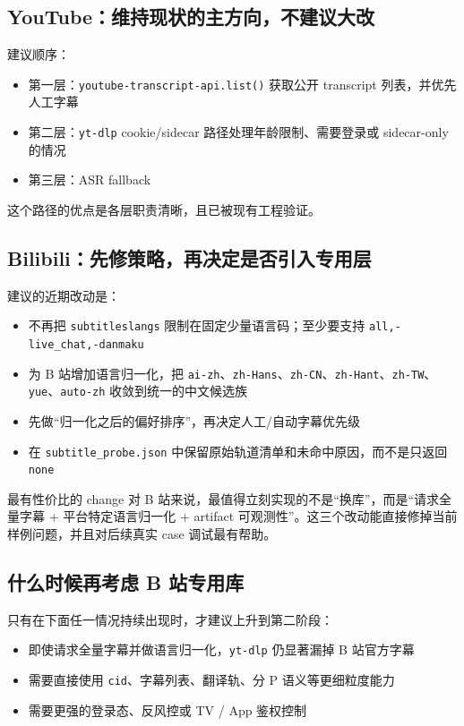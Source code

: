 \documentclass[a4paper]{article}
\begin{document}
\subsection{YouTube：维持现状的主方向，不建议大改}

建议顺序：
\begin{itemize}
\item 第一层：\texttt{youtube-transcript-api.list()} 获取公开 transcript 列表，并优先人工字幕
\item 第二层：\texttt{yt-dlp} cookie/sidecar 路径处理年龄限制、需要登录或 sidecar-only 的情况
\item 第三层：ASR fallback
\end{itemize}

这个路径的优点是各层职责清晰，且已被现有工程验证。

\subsection{Bilibili：先修策略，再决定是否引入专用层}

建议的近期改动是：
\begin{itemize}
\item 不再把 \texttt{subtitleslangs} 限制在固定少量语言码；至少要支持 \texttt{all,-live\_chat,-danmaku}
\item 为 B 站增加语言归一化，把 \texttt{ai-zh}、\texttt{zh-Hans}、\texttt{zh-CN}、\texttt{zh-Hant}、\texttt{zh-TW}、\texttt{yue}、\texttt{auto-zh} 收敛到统一的中文候选族
\item 先做“归一化之后的偏好排序”，再决定人工/自动字幕优先级
\item 在 \texttt{subtitle\_probe.json} 中保留原始轨道清单和未命中原因，而不是只返回 \texttt{none}
\end{itemize}

\begin{findingbox}{最有性价比的 change}
对 B 站来说，最值得立刻实现的不是“换库”，而是“请求全量字幕 + 平台特定语言归一化 + artifact 可观测性”。这三个改动能直接修掉当前样例问题，并且对后续真实 case 调试最有帮助。
\end{findingbox}

\subsection{什么时候再考虑 B 站专用库}

只有在下面任一情况持续出现时，才建议上升到第二阶段：
\begin{itemize}
\item 即使请求全量字幕并做语言归一化，\texttt{yt-dlp} 仍显著漏掉 B 站官方字幕
\item 需要直接使用 \texttt{cid}、字幕列表、翻译轨、分 P 语义等更细粒度能力
\item 需要更强的登录态、反风控或 TV / App 鉴权控制
\end{itemize}
\end{document}
